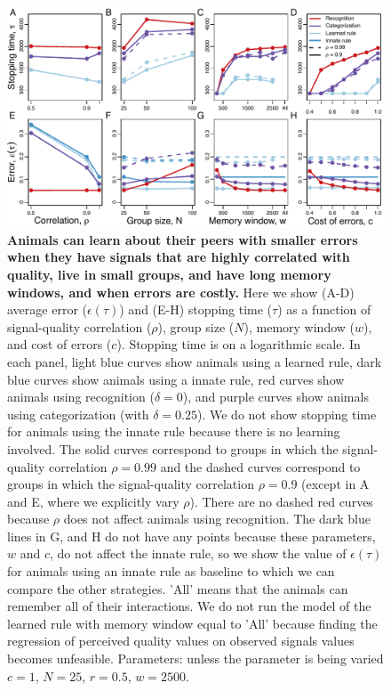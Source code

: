 \begin{figure}
\includegraphics[width=6.85in]{figures/parameters_exploration.pdf}
\caption{\sffamily\small\textbf{Animals can learn about their peers with smaller errors when they have signals that are highly correlated with quality, live in small groups, and have long memory windows, and when errors are costly.} Here we show (A-D) average error ($\epsilon(\tau)$) and (E-H) stopping time ($\tau$) as a function of signal-quality correlation ($\rho$), group size ($N$), memory window ($w$), and cost of errors ($c$). Stopping time is on a logarithmic scale. In each panel, light blue curves show animals using a learned rule, dark blue curves show animals using a innate rule, red curves show animals using recognition ($\delta=0$), and purple curves show animals using categorization (with $\delta=0.25$). We do not show stopping time for animals using the innate rule because there is no learning involved.  The solid curves correspond to groups in which the signal-quality correlation $\rho=0.99$ and the dashed curves correspond to groups in which the signal-quality correlation $\rho=0.9$ (except in A and E, where we explicitly vary $\rho$). There are no dashed red curves because $\rho$ does not affect animals using recognition. The dark blue lines in G, and H do not have any points because these parameters, $w$ and $c$, do not affect the innate rule, so we show the value of $\epsilon(\tau)$ for animals using an innate rule as baseline to which we can compare the other strategies. 'All' means that the animals can remember all of their interactions. We do not run the model of the learned rule with memory window equal to 'All' because finding the regression of perceived quality values on observed signals values becomes unfeasible. Parameters: unless the parameter is being varied $c=1$, $N=25$, $r=0.5$, $w=2500$.}
\label{parameters}
\end{figure}

